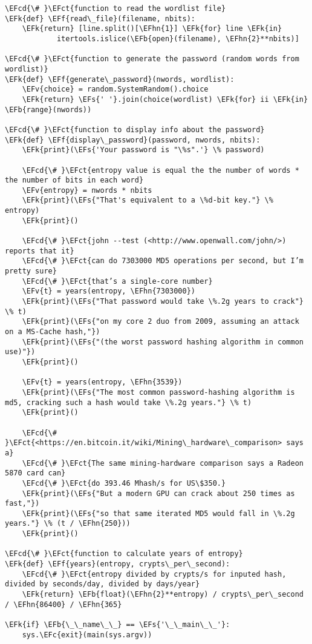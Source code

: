 \documentclass{scrartcl}
\newcommand{\EFk}[1]{\textcolor{EFk}{#1}} %
\newcommand{\EFs}[1]{\textcolor{EFs}{#1}} %
\newcommand{\EFb}[1]{\textcolor{EFb}{#1}} %
\newcommand{\EFct}[1]{\textcolor{EFct}{#1}} %
\newcommand{\EFc}[1]{\textcolor{EFc}{#1}} %
\newcommand{\EFv}[1]{\textcolor{EFv}{#1}} %
\newcommand{\EFf}[1]{\textcolor{EFf}{#1}} %
\newcommand{\EFcd}[1]{\textcolor{EFcd}{#1}} %
\newcommand{\EFhn}[1]{#1} %
\begin{document}
\begin{Code}
\begin{Verbatim}[]
\EFcd{\# }\EFct{function to read the wordlist file}
\EFk{def} \EFf{read\_file}(filename, nbits):
    \EFk{return} [line.split()[\EFhn{1}] \EFk{for} line \EFk{in}
            itertools.islice(\EFb{open}(filename), \EFhn{2}**nbits)]

\EFcd{\# }\EFct{function to generate the password (random words from wordlist)}
\EFk{def} \EFf{generate\_password}(nwords, wordlist):
    \EFv{choice} = random.SystemRandom().choice
    \EFk{return} \EFs{' '}.join(choice(wordlist) \EFk{for} ii \EFk{in} \EFb{range}(nwords))

\EFcd{\# }\EFct{function to display info about the password}
\EFk{def} \EFf{display\_password}(password, nwords, nbits):
    \EFk{print}(\EFs{'Your password is "\%s".'} \% password)

    \EFcd{\# }\EFct{entropy value is equal the the number of words * the number of bits in each word}
    \EFv{entropy} = nwords * nbits
    \EFk{print}(\EFs{"That's equivalent to a \%d-bit key."} \% entropy)
    \EFk{print}()

    \EFcd{\# }\EFct{john --test (<http://www.openwall.com/john/>) reports that it}
    \EFcd{\# }\EFct{can do 7303000 MD5 operations per second, but I’m pretty sure}
    \EFcd{\# }\EFct{that’s a single-core number}
    \EFv{t} = years(entropy, \EFhn{7303000})
    \EFk{print}(\EFs{"That password would take \%.2g years to crack"} \% t)
    \EFk{print}(\EFs{"on my core 2 duo from 2009, assuming an attack on a MS-Cache hash,"})
    \EFk{print}(\EFs{"(the worst password hashing algorithm in common use)"})
    \EFk{print}()

    \EFv{t} = years(entropy, \EFhn{3539})
    \EFk{print}(\EFs{"The most common password-hashing algorithm is md5, cracking such a hash would take \%.2g years."} \% t)
    \EFk{print}()

    \EFcd{\# }\EFct{<https://en.bitcoin.it/wiki/Mining\_hardware\_comparison> says a}
    \EFcd{\# }\EFct{The same mining-hardware comparison says a Radeon 5870 card can}
    \EFcd{\# }\EFct{do 393.46 Mhash/s for US\$350.}
    \EFk{print}(\EFs{"But a modern GPU can crack about 250 times as fast,"})
    \EFk{print}(\EFs{"so that same iterated MD5 would fall in \%.2g years."} \% (t / \EFhn{250}))
    \EFk{print}()

\EFcd{\# }\EFct{function to calculate years of entropy}
\EFk{def} \EFf{years}(entropy, crypts\_per\_second):
    \EFcd{\# }\EFct{entropy divided by crypts/s for inputed hash, divided by seconds/day, divided by days/year}
    \EFk{return} \EFb{float}(\EFhn{2}**entropy) / crypts\_per\_second / \EFhn{86400} / \EFhn{365}

\EFk{if} \EFb{\_\_name\_\_} == \EFs{'\_\_main\_\_'}:
    sys.\EFc{exit}(main(sys.argv))

\end{Verbatim}
\end{Code}
\end{document}
